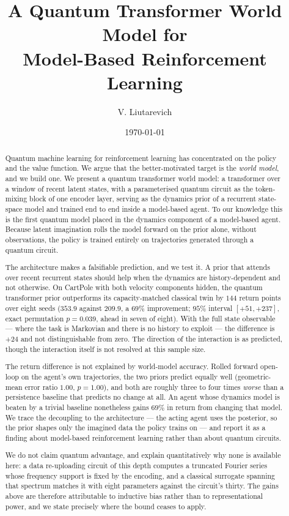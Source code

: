\documentclass[11pt,onecolumn]{article}
\title{\bfseries A Quantum Transformer World Model for\\
       Model-Based Reinforcement Learning}
\author{V. Liutarevich
        \affiliation{\pend{affiliation}}
        \email{\pend{contact email}}}
\date{\today}
\newcommand{\maketitlefallback}{\maketitle}
\begin{document}
\maketitlefallback

\begin{abstract}
\noindent
Quantum machine learning for reinforcement learning has concentrated on
the policy and the value function. We argue that the better-motivated
target is the \emph{world model}, and we build one. We present a quantum
transformer world model: a transformer over a window of recent latent
states, with a parameterised quantum circuit as the token-mixing block
of one encoder layer, serving as the dynamics prior of a recurrent
state-space model and trained end to end inside a model-based agent. To
our knowledge this is the first quantum model placed in the dynamics
component of a model-based agent. Because latent imagination rolls the
model forward on the prior alone, without observations, the policy is
trained entirely on trajectories generated through a quantum circuit.

The architecture makes a falsifiable prediction, and we test it. A prior
that attends over recent recurrent states should help when the dynamics
are history-dependent and not otherwise. On CartPole with both velocity
components hidden, the quantum transformer prior outperforms its
capacity-matched classical twin by $144$ return points over eight seeds
($353.9$ against $209.9$, a $69\%$ improvement; $95\%$ interval
$[+51, +237]$, exact permutation $p = 0.039$, ahead in seven of eight).
With the full state observable --- where the task is Markovian and there
is no history to exploit --- the difference is $+24$ and not
distinguishable from zero. The direction of the interaction is as
predicted, though the interaction itself is not resolved at this sample
size.

The return difference is not explained by world-model accuracy. Rolled
forward open-loop on the agent's own trajectories, the two priors
predict equally well (geometric-mean error ratio $1.00$, $p = 1.00$),
and both are roughly three to four times \emph{worse} than a
persistence baseline that predicts no change at all. An agent whose
dynamics model is beaten by a trivial baseline nonetheless gains
$69\%$ in return from changing that model. We trace the decoupling to
the architecture --- the acting agent uses the posterior, so the prior
shapes only the imagined data the policy trains on --- and report it as
a finding about model-based reinforcement learning rather than about
quantum circuits.

We do not claim quantum advantage, and explain quantitatively why none
is available here: a data re-uploading circuit of this depth computes a
truncated Fourier series whose frequency support is fixed by the
encoding, and a classical surrogate spanning that spectrum matches it
with eight parameters against the circuit's thirty. The gains above are
therefore attributable to inductive bias rather than to representational
power, and we state precisely where the bound ceases to apply.


\end{abstract}
\end{document}
